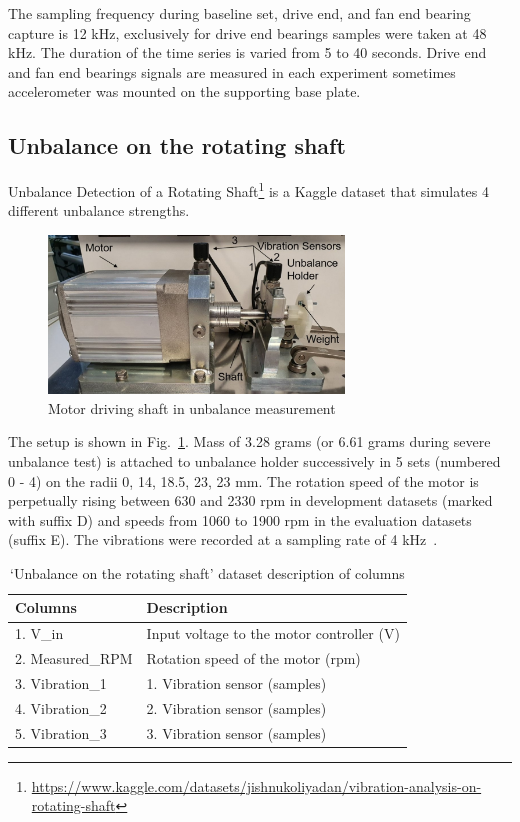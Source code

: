 The sampling frequency during baseline set, drive end, and fan end bearing capture is 12 kHz, exclusively for drive end bearings samples were taken at 48 kHz. The duration of the time series is varied from 5 to 40 seconds. Drive end and fan end bearings signals are measured in each experiment sometimes accelerometer was mounted on the supporting base plate.

\subsection{Unbalance on the rotating shaft}
Unbalance Detection of a Rotating Shaft\footnote{\url{https://www.kaggle.com/datasets/jishnukoliyadan/vibration-analysis-on-rotating-shaft}} is a Kaggle dataset that simulates 4 different unbalance strengths. 
\begin{figure}[h]
\centering
\includegraphics[width=0.7\textwidth]{assets/rotating-shaft.jpg}
\caption{Motor driving shaft in unbalance measurement \cite{mey_machine_2020}}
\label{fig:rotating-shaft}
\end{figure}

The setup is shown in Fig.~\ref{fig:rotating-shaft}. Mass of 3.28 grams (or 6.61 grams during severe unbalance test) is attached to unbalance holder successively in 5 sets (numbered 0 - 4) on the radii 0, 14, 18.5, 23, 23 mm. The rotation speed of the motor is perpetually rising between 630 and 2330 rpm in development datasets (marked with suffix D) and speeds from 1060 to 1900 rpm in the evaluation datasets (suffix E). The vibrations were recorded at a sampling rate of 4 kHz~\cite{mey_machine_2020}.

\begin{table}[h]
\centering
\renewcommand{\arraystretch}{1.2}
\begin{tabular}{|l|l|}
\hline
\textbf{Columns} & \textbf{Description}                      \\ \hline
1. V\_in         & Input voltage to the motor controller (V) \\ \hline
2. Measured\_RPM & Rotation speed of the motor (rpm)  \\ \hline
3. Vibration\_1  & 1. Vibration sensor (samples)             \\ \hline
4. Vibration\_2  & 2. Vibration sensor (samples)             \\ \hline
5. Vibration\_3  & 3. Vibration sensor (samples)             \\ \hline
\end{tabular}
\caption{`Unbalance on the rotating shaft' dataset description of columns}
\end{table}


